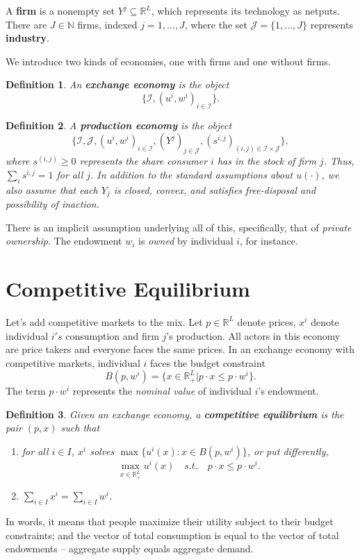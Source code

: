 \documentclass[11pt, twocolumn]{article}
\newcommand{\N}{\mathbb{N}}
\newcommand{\R}{\mathbb{R}}
\newtheorem{definition}{Definition}
\theoremstyle{definition}
\begin{document}
A \textbf{firm} is a nonempty set $Y^j \subseteq \R^L$, which represents its technology as netputs. There are $J \in \N$ firms, indexed $j=1, \hdots, J$, where the set $\mathcal{J}=\{1, \hdots, J\}$ represents \textbf{industry}. 

We introduce two kinds of economies, one with firms and one without firms. 
\begin{definition}
	An \textbf{exchange economy} is the object 
		\[	\{ \mathcal{I}, (u^i, w^i)_{i \in \mathcal{I}}\}. \]
\end{definition}

\begin{definition}
	A \textbf{production economy} is the object 
	\[	\{ \mathcal{I}, \mathcal{J}, (u^i, w^i)_{i \in \mathcal{I}},  (Y^j)_{ j \in \mathcal{J}}, (s^{i,j})_{(i,j) \in \mathcal{I} \times \mathcal{J}}\}, \]
	where $s^{(i,j)} \geq 0$ represents the share consumer $i$ has in the stock of firm $j$. Thus, $\sum_{i} s^{i,j}=1$ for all $j$. In addition to the standard assumptions about $u(\cdot)$, we also assume that each $Y_j$ is closed, convex, and satisfies free-disposal and possibility of inaction.
\end{definition}
There is an implicit assumption underlying all of this, specifically, that of \emph{private ownership}. The endowment $w_i$ is \emph{owned} by individual $i$, for instance. 



\section*{Competitive Equilibrium}
Let's add competitive markets to the mix. Let $p \in \R^L$ denote prices, $x^i$ denote individual $i's$ consumption and firm $j$'s production. All actors in this economy are price takers and everyone faces the same prices. In an exchange economy with competitive markets, individual $i$ faces the budget constraint
	\[B(p,w^i) = \{ x \in \R^L_+| p \cdot x \leq p \cdot w^i\}.	\]
The term $p \cdot w^i$ represents the \emph{nominal value} of individual $i$'s endowment. 
\begin{definition}
	Given an exchange economy, a \textbf{competitive equilibrium} is the pair $(p, x)$ such that
	\begin{enumerate}
		\item for all $i \in I$, $x^i$ solves $\max \{u^i(x) : x \in B(p,w^i) \}$, or put differently,
		\[\max_{x \in \R^L_+} u^i(x) \quad s.t. \quad p \cdot x \leq p \cdot w^i.	\]	
		\item $\sum_{i \in I} x^i = \sum_{i\in I}w^i$.
	\end{enumerate}
\end{definition}
In words, it means that people maximize their utility subject to their budget constraints; and the vector of total consumption is equal to the vector of total endowments -- aggregate supply equals aggregate demand.
\end{document}
